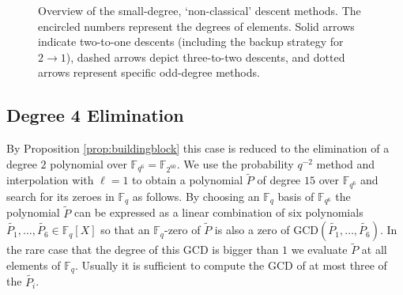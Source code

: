 \documentclass[11pt]{llncs}
\newcommand{\F}{\mathbb F}
\begin{document}
\begin{figure}[t]
  \begin{center}
  \end{center}
  \caption{Overview of the small-degree, `non-classical' descent methods.
    The encircled numbers represent the degrees of elements.  Solid
    arrows indicate two-to-one descents (including the backup strategy
    for $2 \to 1$), dashed arrows depict three-to-two descents, and
    dotted arrows represent specific odd-degree methods.}
  \label{fig:small-degree}
\end{figure}

\subsection{Degree 4 Elimination}

By Proposition \ref{prop:buildingblock} this case is reduced to
the elimination of a degree $2$ polynomial over $\F_{q^6}=\F_{2^{60}}$.
We use the probability $q^{-2}$ method and interpolation with $\ell = 1$
to obtain a polynomial $\tilde P$ of degree $15$ over $\F_{q^6}$ and
search for its zeroes in $\F_q$ as follows.
By choosing an $\F_q$ basis of $\F_{q^6}$ the polynomial $\tilde P$
can be expressed as a linear combination of six polynomials
$\tilde{P_1}, \dots, \tilde{P_6} \in \F_q[X]$ so that an $\F_q$-zero
of $\tilde P$ is also a zero of $\text{GCD}(\tilde{P_1}, \dots, \tilde{P_6})$.
In the rare case that the degree of this GCD is bigger than $1$ we
evaluate $\tilde P$ at all elements of $\F_q$.
Usually it is sufficient to compute the GCD of at most three of the
$\tilde{P_i}$.
\end{document}
